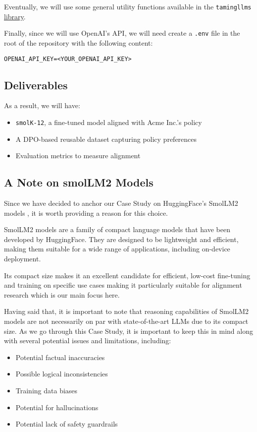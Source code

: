 Eventually, we will use some general utility functions available in the \texttt{tamingllms} \href{https://github.com/souzatharsis/tamingLLMs/blob/master/tamingllms/notebooks/taming_utils.py}{library}.

Finally, since we will use OpenAI's API, we will need create a \texttt{.env} file in the root of the repository with the following content:

\begin{verbatim}
OPENAI_API_KEY=<YOUR_OPENAI_API_KEY>
\end{verbatim}

\subsection{Deliverables}

As a result, we will have:

\begin{itemize}
\item \texttt{smolK-12}, a fine-tuned model aligned with Acme Inc.'s policy 
\item A DPO-based reusable dataset capturing policy preferences
\item Evaluation metrics to measure alignment
\end{itemize}

\subsection{A Note on smolLM2 Models}

Since we have decided to anchor our Case Study on HuggingFace's SmolLM2 models , it is worth providing a reason for this choice.

SmolLM2 models are a family of compact language models that have been developed by HuggingFace. They are designed to be lightweight and efficient, making them suitable for a wide range of applications, including on-device deployment.

Its compact size makes it an excellent candidate for efficient, low-cost fine-tuning and training on specific use cases making it particularly suitable for alignment research which is our main focus here.

Having said that, it is important to note that reasoning capabilities of SmolLM2 models are not necessarily on par with state-of-the-art LLMs due to its compact size. As we go through this Case Study, it is important to keep this in mind along with several potential issues and limitations, including:
\begin{itemize}
\item Potential factual inaccuracies
\item Possible logical inconsistencies
\item Training data biases
\item Potential for hallucinations
\item Potential lack of safety guardrails
\end{itemize}

